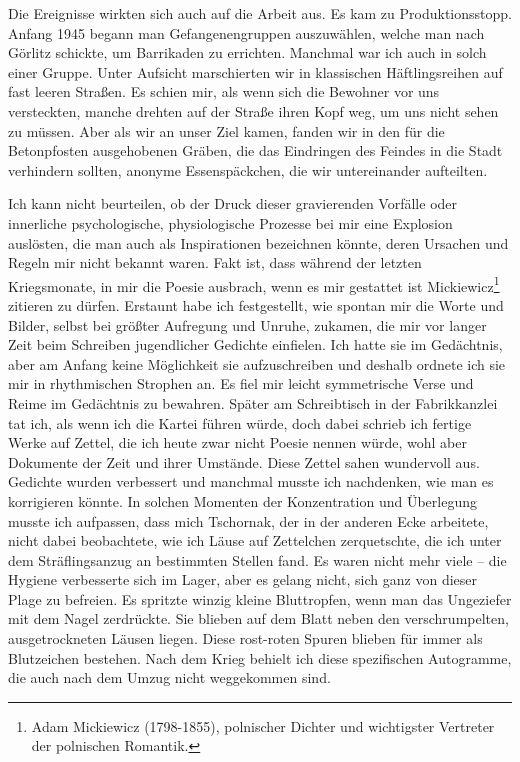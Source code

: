 Die Ereignisse wirkten sich auch auf die Arbeit aus. Es kam zu Produktionsstopp. Anfang 1945 begann man Gefangenengruppen auszuwählen, welche man nach Görlitz schickte, um Barrikaden zu errichten. Manchmal war ich auch in solch einer Gruppe. Unter Aufsicht marschierten wir in klassischen Häftlingsreihen auf fast leeren Straßen. Es schien mir, als wenn sich die Bewohner vor uns versteckten, manche drehten auf der Straße ihren Kopf weg, um uns nicht sehen zu müssen. Aber als wir an unser Ziel kamen, fanden wir in den für die Betonpfosten ausgehobenen Gräben, die das Eindringen des Feindes in die Stadt verhindern sollten, anonyme Essenspäckchen, die wir untereinander aufteilten.

Ich kann nicht beurteilen, ob der Druck dieser gravierenden Vorfälle oder innerliche psychologische, physiologische Prozesse bei mir eine Explosion auslösten, die man auch als Inspirationen bezeichnen könnte, deren Ursachen und Regeln mir nicht bekannt waren. Fakt ist, dass während der letzten Kriegsmonate, in mir die \glqq Poesie ausbrach\grqq, wenn es mir gestattet ist Mickiewicz\footnote{Adam Mickiewicz (1798-1855), polnischer Dichter und wichtigster Vertreter der polnischen Romantik.} zitieren zu dürfen. Erstaunt habe ich festgestellt, wie spontan mir die Worte und Bilder, selbst bei größter Aufregung und Unruhe, zukamen, die mir vor langer Zeit beim Schreiben jugendlicher Gedichte einfielen. Ich hatte sie im Gedächtnis, aber am Anfang keine Möglichkeit sie aufzuschreiben und deshalb ordnete ich sie mir in rhythmischen Strophen an. Es fiel mir leicht symmetrische Verse und Reime im Gedächtnis zu bewahren. Später am Schreibtisch in der Fabrikkanzlei tat ich, als wenn ich die Kartei führen würde, doch dabei schrieb ich fertige Werke auf Zettel, die ich heute zwar nicht Poesie nennen würde, wohl aber Dokumente der Zeit und ihrer Umstände. 
Diese Zettel sahen wundervoll aus. Gedichte wurden verbessert und manchmal musste ich nachdenken, wie man es korrigieren könnte. In solchen Momenten der Konzentration und Überlegung musste ich aufpassen, dass mich Tschornak, der in der anderen Ecke arbeitete, nicht dabei beobachtete, wie ich Läuse auf Zettelchen zerquetschte, die ich unter dem Sträflingsanzug an bestimmten Stellen fand. Es waren nicht mehr viele -- die Hygiene verbesserte sich im Lager, aber es gelang nicht, sich ganz von dieser Plage zu befreien. Es spritzte winzig kleine Bluttropfen, wenn man das Ungeziefer mit dem Nagel zerdrückte. Sie blieben auf dem Blatt neben den verschrumpelten, ausgetrockneten Läusen liegen. Diese rost-roten Spuren blieben für immer als Blutzeichen bestehen. Nach dem Krieg behielt ich diese spezifischen Autogramme, die auch nach dem Umzug nicht weggekommen sind.


